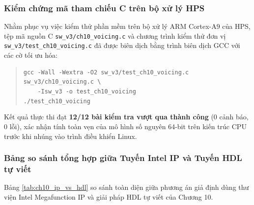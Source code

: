 \subsubsection*{Kiểm chứng mã tham chiếu C trên bộ xử lý HPS}
Nhằm phục vụ việc kiểm thử phần mềm trên bộ xử lý ARM Cortex-A9 của HPS, tệp mã nguồn C \texttt{sw\_v3/ch10\_voicing.c} và chương trình kiểm thử đơn vị \texttt{sw\_v3/test\_ch10\_voicing.c} đã được biên dịch bằng trình biên dịch GCC với các cờ tối ưu hóa:
\begin{quote}
\footnotesize
\texttt{gcc -Wall -Wextra -O2 sw\_v3/test\_ch10\_voicing.c sw\_v3/ch10\_voicing.c \textbackslash}\\
\texttt{\ \ \ \ -Isw\_v3 -o test\_ch10\_voicing}\\
\texttt{./test\_ch10\_voicing}
\end{quote}
Kết quả thực thi đạt \textbf{12/12 bài kiểm tra vượt qua thành công} (0 cảnh báo, 0 lỗi), xác nhận tính toàn vẹn của mô hình số nguyên 64-bit trên kiến trúc CPU trước khi nhúng vào trình điều khiển Linux.

\subsubsection*{Bảng so sánh tổng hợp giữa Tuyến Intel IP và Tuyến HDL tự viết}
Bảng \ref{tab:ch10_ip_vs_hdl} so sánh toàn diện giữa phương án giả định dùng thư viện Intel Megafunction IP và giải pháp HDL tự viết của Chương 10.

